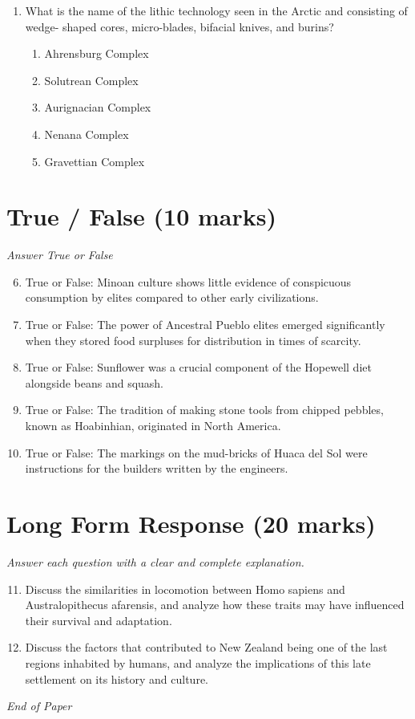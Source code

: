 \documentclass[12pt]{article}
\begin{document}
\begin{enumerate}[label=\arabic*.]
\begin{enumerate}[label=(\alph*)]
    \item Wallace Trench
    \item New Guinea Strait
\end{enumerate}
\item What is the name of the lithic technology seen in the Arctic and consisting of wedge-
shaped cores, micro-blades, bifacial knives, and burins?
\begin{enumerate}[label=(\alph*)]
    \item Ahrensburg Complex
    \item Solutrean Complex
    \item Aurignacian Complex
    \item Nenana Complex
    \item Gravettian Complex
\end{enumerate}
\end{enumerate}

\section*{True / False (10 marks)}
\textit{Answer True or False}
\begin{enumerate}[label=\arabic*.]
\setcounter{enumi}{5}
\item True or False: Minoan culture shows little evidence of conspicuous consumption by elites compared to other early civilizations.
\item True or False: The power of Ancestral Pueblo elites emerged significantly when they stored food surpluses for distribution in times of scarcity.
\item True or False: Sunflower was a crucial component of the Hopewell diet alongside beans and squash.
\item True or False: The tradition of making stone tools from chipped pebbles, known as Hoabinhian, originated in North America.
\item True or False: The markings on the mud-bricks of Huaca del Sol were instructions for the builders written by the engineers.
\end{enumerate}

\section*{Long Form Response (20 marks)}
\textit{Answer each question with a clear and complete explanation.}
\begin{enumerate}[label=\arabic*.]
\setcounter{enumi}{10}
\item Discuss the similarities in locomotion between Homo sapiens and Australopithecus
afarensis, and analyze how these traits may have influenced their survival and adaptation.
\item Discuss the factors that contributed to New Zealand being one of the last regions
inhabited by humans, and analyze the implications of this late settlement on its history
and culture.
\end{enumerate}

\vfill
\noindent\textit{End of Paper}
\end{document}
